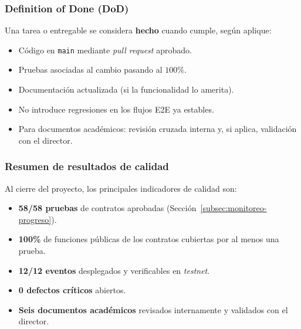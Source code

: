 \documentclass[12pt,oneside]{report}
\begin{document}
      \subsubsection{Definition of Done (DoD)}
      Una tarea o entregable se considera \textbf{hecho} cuando cumple, según aplique:
      \begin{itemize}
        \item Código en \texttt{main} mediante \textit{pull request} aprobado.
        \item Pruebas asociadas al cambio pasando al $100\%$.
        \item Documentación actualizada (si la funcionalidad lo amerita).
        \item No introduce regresiones en los flujos E2E ya estables.
        \item Para documentos académicos: revisión cruzada interna y, si aplica, validación con el director.
      \end{itemize}

      \subsubsection{Resumen de resultados de calidad}
      Al cierre del proyecto, los principales indicadores de calidad son:
      \begin{itemize}
        \item \textbf{58/58 pruebas} de contratos aprobadas (Sección~\ref{subsec:monitoreo-progreso}).
        \item \textbf{100\%} de funciones públicas de los contratos cubiertas por al menos una prueba.
        \item \textbf{12/12 eventos} desplegados y verificables en \textit{testnet}.
        \item \textbf{0 defectos críticos} abiertos.
        \item \textbf{Seis documentos académicos} revisados internamente y validados con el director.
      \end{itemize}

\end{document}
